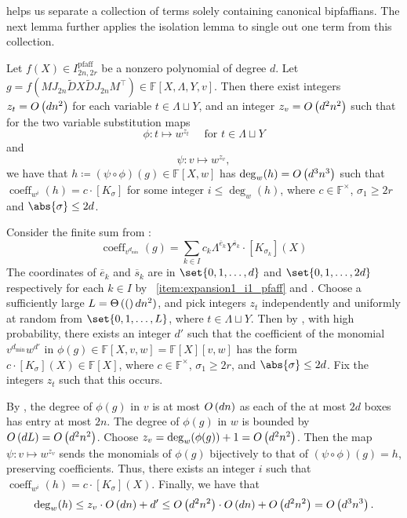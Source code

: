\documentclass[10pt,a4paper]{amsart}
\DeclareMathOperator{\pfaff}{pfaff}
\DeclareMathOperator{\coeff}{coeff}
\newcommand*\F{\mathbb{F}}
\newcommand*\defeq{\coloneqq}
\newcommand*\bigO[1]{%
    O\kern-0.0pt\left(#1\right)
}
\newcommand*\bigTheta[1]{%
    \Theta\kern-0.0pt\left(#1\right)
}
\begin{document}
 helps us separate a collection of terms solely containing canonical bipfaffians.
The next lemma further applies the isolation lemma to single out one term from this collection.

\begin{lem}\label{lem:univariate_pfaff}
Let $f(X) \in I^{\pfaff}_{2n, 2r}$ be a nonzero polynomial of degree $d$.
Let $g = f(M J_{2n} \widetilde{D} X \widetilde{D} J_{2n} M^\top) \in \F[X, \Lambda, Y, v]$.
Then there exist integers $z_t = \bigO{dn^2}$ for each variable $t\in \Lambda \sqcup Y$, and an integer $z_v = \bigO{d^2 n^2}$ such that for the two variable substitution maps 
\[
    \phi\colon t \mapsto w^{z_t} \quad\text{ for } t\in \Lambda \sqcup Y
\]
and
\[
    \psi\colon v \mapsto w^{z_v},
\]
we have that $h \defeq (\psi\circ\phi)(g)\in\F[X,w]$ has $\deg_w(h) = \bigO{d^3 n^3}$ such that $\coeff_{w^i}(h) = c\cdot [K_\sigma]$ for some integer $i \leq \deg_w(h)$, where $c\in\F^\times$, $\sigma_1\geq 2r$ and $\abs{\sigma}\leq 2d$.
\end{lem}
\begin{pf}
Consider the finite sum from :
\[
    \coeff_{v^{d_{\min}}}(g) = \sum_{k\in I} c_k \Lambda^{\overline{e}_k} Y^{\overline{s}_k} \cdot [K_{\sigma_k}](X)
\]
The coordinates of $\overline{e}_k$ and $\overline{s}_k$ are in $\set{0,1,\dots,d}$ and $\set{0, 1, \dots, 2d}$ respectively for each $k \in I$ by ~\eqref{item:expansion1_i1_pfaff} and .
Choose a sufficiently large $L = \bigTheta(dn^2)$, and pick integers $z_t$ independently and uniformly at random from $\set{0, 1, \dots, L}$, where $t\in \Lambda \sqcup Y$.
Then by , with high probability, there exists an integer $d'$ such that the coefficient of the monomial $v^{d_{\min}}w^{d'}$ in $\phi(g) \in \F[X,v,w]=\F[X][v,w]$ has the form $c\cdot [K_\sigma](X) \in \F[X]$, where $c\in\F^\times$, $\sigma_1 \geq 2r$, and $\abs{\sigma} \leq 2d$.
Fix the integers $z_t$ such that this occurs.

By , the degree of $\phi(g)$ in $v$ is at most $\bigO{dn}$ as each of the at most $2d$ boxes has entry at most $2n$.
The degree of $\phi(g)$ in $w$ is bounded by $\bigO{dL} = \bigO{d^2 n^2}$.
Choose $z_v=\deg_w(\phi(g))+ 1 = \bigO{d^2 n^2}$.
Then the map $\psi\colon v\mapsto w^{z_v}$ sends the monomials of $\phi(g)$ bijectively to that of $(\psi\circ\phi)(g)=h$, preserving coefficients.
Thus, there exists an integer $i$ such that $\coeff_{w^i}(h) = c\cdot [K_\sigma](X)$.
Finally, we have that
\[
    \deg_w(h) \leq z_v \cdot \bigO{dn} + d' \leq \bigO{d^2 n^2} \cdot \bigO{dn} + \bigO{d^2 n^2} = \bigO{d^3 n^3}.
\]
\end{pf}
\end{document}
